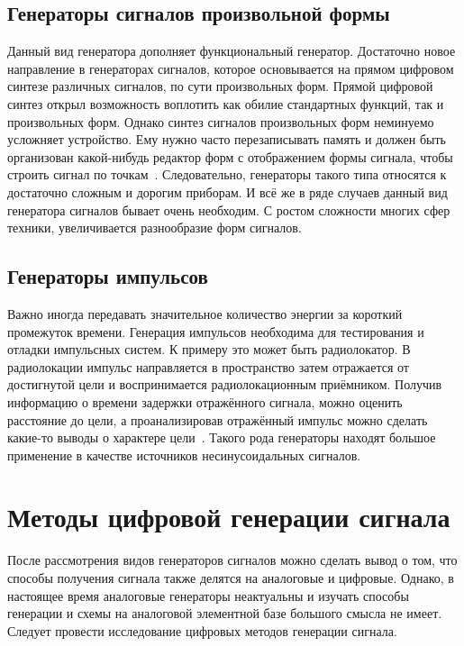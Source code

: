 \subsection{Генераторы сигналов произвольной формы}
	Данный вид генератора дополняет функциональный генератор. Достаточно новое направление в генераторах сигналов, которое основывается на прямом цифровом синтезе различных сигналов, по сути произвольных форм. Прямой цифровой синтез открыл возможность воплотить как обилие стандартных функций, так и произвольных форм. Однако синтез сигналов произвольных форм неминуемо усложняет устройство. Ему нужно часто перезаписывать память и должен быть организован какой-нибудь редактор форм с отображением формы сигнала, чтобы строить сигнал по точкам~\cite{dgs}. Следовательно, генераторы такого типа относятся к достаточно сложным и дорогим приборам.
	И всё же в ряде случаев данный вид генератора сигналов бывает очень необходим. С ростом сложности многих сфер техники, увеличивается разнообразие форм сигналов.

\subsection{Генераторы импульсов}
	Важно иногда передавать значительное количество энергии за короткий промежуток времени. Генерация импульсов необходима для тестирования и отладки импульсных систем. К примеру это может быть радиолокатор. В радиолокации импульс направляется в пространство затем отражается от достигнутой цели и воспринимается радиолокационным приёмником. Получив информацию о времени задержки отражённого сигнала, можно оценить расстояние до цели, а проанализировав отражённый импульс можно сделать какие-то выводы о характере цели~\cite{dgs}. Такого рода генераторы находят большое применение в качестве источников несинусоидальных сигналов. %


\section{Методы цифровой генерации сигнала}

	После рассмотрения видов генераторов сигналов можно сделать вывод о том, что способы получения сигнала также делятся на аналоговые и цифровые. Однако, в настоящее время аналоговые генераторы неактуальны и изучать способы генерации и схемы на аналоговой элементной базе большого смысла не имеет. Следует провести исследование цифровых методов генерации сигнала. 
